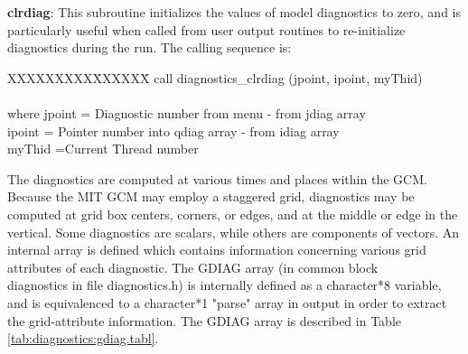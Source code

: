 \noindent
{\bf clrdiag}:  This subroutine initializes the values of model diagnostics to zero, and is
particularly useful when called from user output routines to re-initialize diagnostics 
during the run.  The calling sequence is:

\noindent
\begin{tabbing}
XXXXXXXXX\=XXXXXX\= \kill
\>        call diagnostics\_clrdiag (jpoint, ipoint, myThid) \\
\\
where \>  jpoint \>= Diagnostic number from menu - from jdiag array \\
          ipoint \>= Pointer number into qdiag array - from idiag array \\
      \>  myThid \>=Current Thread number \\
\end{tabbing}

\noindent
The diagnostics are computed at various times and places within the GCM. Because the
MIT GCM may employ a staggered grid, diagnostics may be computed at grid box centers,
corners, or edges, and at the middle or edge in the vertical. Some diagnostics are scalars, 
while others are components of vectors. An internal array is defined which contains 
information concerning various grid attributes of each diagnostic. The GDIAG
array (in common block \\diagnostics in file diagnostics.h) is internally defined as a 
character*8 variable, and is equivalenced to a character*1 "parse" array in output in 
order to extract the grid-attribute information.  The GDIAG array is described in 
Table \ref{tab:diagnostics:gdiag.tabl}.

